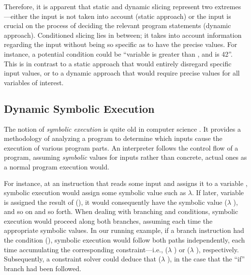 Therefore, it is apparent that static and dynamic slicing represent two extremes---either the input is not taken into account (static approach) or the input is crucial on the process of deciding the relevant program statements (dynamic approach). Conditioned slicing lies in between; it takes into account information regarding the input without being so specific as to have the precise values. For instance, a potential condition could be ``variable  is greater than , and  is 42''. This is in contrast to a static approach that would entirely disregard specific input values, or to a dynamic approach that would require precise values for all variables of interest.


\subsection{Dynamic Symbolic Execution}

The notion of \emph{symbolic execution} is quite old in computer science \todo{}. It provides a methodology of analyzing a program to determine which inputs cause the execution of various program parts. An interpreter follows the control flow of a program, assuming \emph{symbolic} values for inputs rather than concrete, actual ones as a normal program execution would.

For instance, at an instruction that reads some input and assigns it to a variable , symbolic execution would assign some symbolic value such as $\lambda$. If later, variable  is assigned the result of (), it would consequently have the symbolic value ($\lambda$ ), and so on and so forth. When dealing with branching and conditions, symbolic execution would proceed along both branches, assuming each time the appropriate symbolic values. In our running example, if a branch instruction had the condition (), symbolic execution would follow both paths independently, each time accumulating the corresponding constraint---i.e., ($\lambda$ ) or ($\lambda$ ), respectively. Subsequently, a constraint solver could deduce that ($\lambda$ ), in the case that the ``if'' branch had been followed.

